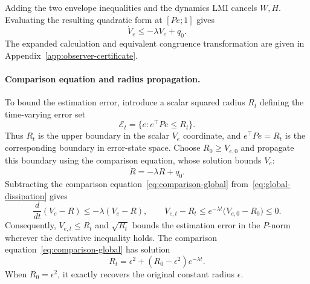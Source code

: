 \documentclass[11pt,a4paper]{article}
\numberwithin{equation}{section}
\theoremstyle{remark}\newtheorem{remark}{Remark}
\begin{document}
Adding the two envelope inequalities and the dynamics LMI cancels $W,H$. Evaluating the resulting quadratic form at $[Pe;1]$ gives
\begin{equation}\label{eq:global-dissipation}
\dot V_e\le-\lambda V_e+q_0.
\end{equation}
The expanded calculation and equivalent congruence transformation are given in Appendix~\ref{app:observer-certificate}.

\paragraph{Comparison equation and radius propagation.}
To bound the estimation error, introduce a scalar squared radius $R_{t}$ defining the time-varying error set
\[
\mathcal E_{t}=\{e:e^\top Pe\le R_{t}\}.
\]
Thus $R_{t}$ is the upper boundary in the scalar $V_e$ coordinate, and $e^\top Pe=R_{t}$ is the corresponding boundary in error-state space. Choose $R_{0}\ge V_{e,0}$ and propagate this boundary using the comparison equation, whose solution bounds $V_e$:
\begin{equation}\label{eq:comparison-global}
\dot R=-\lambda R+q_0.
\end{equation}
Subtracting the comparison equation~\eqref{eq:comparison-global} from~\eqref{eq:global-dissipation} gives
\[
\frac{d}{dt}(V_e-R)\le-\lambda(V_e-R),
\qquad
V_{e,t}-R_{t}\le e^{-\lambda t}\bigl(V_{e,0}-R_{0}\bigr)\le0.
\]
Consequently, $V_{e,t}\le R_{t}$ and $\sqrt{R_{t}}$ bounds the estimation error in the $P$-norm wherever the derivative inequality holds. The comparison equation~\eqref{eq:comparison-global} has solution
\begin{equation}\label{eq:global-solution}
R_{t}=\epsilon^2+(R_{0}-\epsilon^2)e^{-\lambda t}.
\end{equation}
When $R_{0}=\epsilon^2$, it exactly recovers the original constant radius $\epsilon$.
\end{document}
